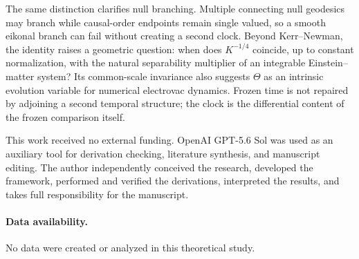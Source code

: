 \documentclass[aps,prl,reprint]{revtex4-2}
\begin{document}
The same distinction clarifies null branching. Multiple connecting null geodesics may branch while causal-order endpoints remain single valued, so a smooth eikonal branch can fail without creating a second clock. Beyond Kerr--Newman, the identity raises a geometric question: when does $K^{-1/4}$ coincide, up to constant normalization, with the natural separability multiplier of an integrable Einstein--matter system? Its common-scale invariance also suggests $\Theta$ as an intrinsic evolution variable for numerical electrovac dynamics. Frozen time is not repaired by adjoining a second temporal structure; the clock is the differential content of the frozen comparison itself.

\begin{acknowledgments}
This work received no external funding. OpenAI GPT-5.6 Sol was used as an auxiliary tool for derivation checking, literature synthesis, and manuscript editing. The author independently conceived the research, developed the framework, performed and verified the derivations, interpreted the results, and takes full responsibility for the manuscript.
\end{acknowledgments}

\paragraph*{Data availability.}
No data were created or analyzed in this theoretical study.
\end{document}
